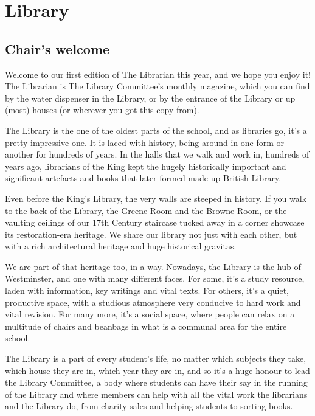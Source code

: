 \documentclass[12pt,a4paper]{report}
\begin{document}


\chapter{Library}

\begin{multicols}{2}

\section{Chair's welcome}

\begin{multicols}{2}
Welcome to our first edition of The Librarian this year, and we hope you enjoy it! The Librarian is The Library Committee’s monthly magazine, which you can find by the water dispenser in the Library, or by the entrance of the Library or up (most) houses (or wherever you got this copy from).

The Library is the one of the oldest parts of the school, and as libraries go, it’s a pretty impressive one. It is laced with history, being around in one form or another for hundreds of years. In the halls that we walk and work in, hundreds of years ago, librarians of the King kept the hugely historically important and significant artefacts and books that later formed made up British Library.

Even before the King’s Library, the very walls are steeped in history. If you walk to the back of the Library, the Greene Room and the Browne Room, or the vaulting ceilings of our 17th Century staircase tucked away in a corner showcase its restoration-era heritage. We share our library not just with each other, but with a rich architectural heritage and huge historical gravitas.

We are part of that heritage too, in a way. Nowadays, the Library is the hub of Westminster, and one with many different faces. For some, it’s a study resource, laden with information, key writings and vital texts. For others, it’s a quiet, productive space, with a studious atmosphere very conducive to hard work and vital revision. For many more, it’s a social space, where people can relax on a multitude of chairs and beanbags in what is a communal area for the entire school.

The Library is a part of every student’s life, no matter which subjects they take, which house they are in, which year they are in, and so it’s a huge honour to lead the Library Committee, a body where students can have their say in the running of the Library and where members can help with all the vital work the librarians and the Library do, from charity sales and helping students to sorting books.


\end{multicols}
\end{multicols}
\end{document}
